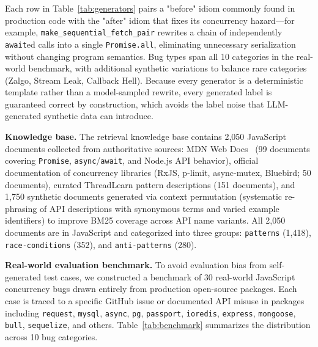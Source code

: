 \documentclass[runningheads]{llncs}
\begin{document}
Each row in Table~\ref{tab:generators} pairs a "before" idiom commonly
found in production code with the "after" idiom that fixes its
concurrency hazard---for example, \texttt{make\_sequential\_fetch\_pair}
rewrites a chain of independently \texttt{await}ed calls into a single
\texttt{Promise.all}, eliminating unnecessary serialization without
changing program semantics.
Bug types span all 10 categories in the real-world benchmark, with
additional synthetic variations to balance rare categories
(Zalgo, Stream Leak, Callback Hell).
Because every generator is a deterministic template rather than a
model-sampled rewrite, every generated label is guaranteed correct by
construction, which avoids the label noise that LLM-generated synthetic
data can introduce.

\textbf{Knowledge base.}
The retrieval knowledge base contains 2,050 JavaScript documents collected
from authoritative sources: MDN Web Docs~\cite{mdn} (99 documents covering
\texttt{Promise}, \texttt{async}/\texttt{await}, and Node.js API
behavior), official documentation of concurrency libraries
(RxJS, p-limit, async-mutex, Bluebird; 50 documents), curated ThreadLearn
pattern descriptions (151 documents), and 1,750 synthetic documents
generated via context permutation (systematic re-phrasing of API descriptions with synonymous
terms and varied example identifiers) to improve BM25
coverage across API name variants.
All 2,050 documents are in JavaScript and categorized into three groups:
\texttt{patterns} (1,418), \texttt{race-conditions} (352), and
\texttt{anti-patterns} (280).

\textbf{Real-world evaluation benchmark.}
To avoid evaluation bias from self-generated test cases, we constructed
a benchmark of 30 real-world JavaScript concurrency bugs drawn entirely
from production open-source packages.
Each case is traced to a specific GitHub issue or documented API misuse
in packages including \texttt{request}, \texttt{mysql}, \texttt{async},
\texttt{pg}, \texttt{passport}, \texttt{ioredis}, \texttt{express},
\texttt{mongoose}, \texttt{bull}, \texttt{sequelize}, and others.
Table~\ref{tab:benchmark} summarizes the distribution across 10 bug
categories.
\end{document}
